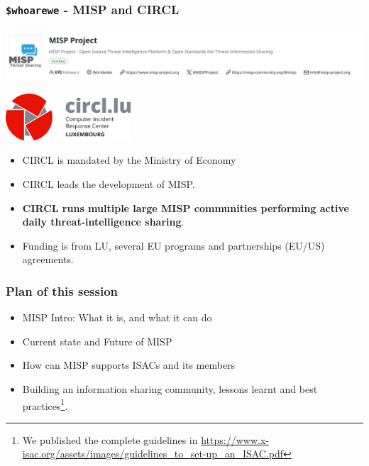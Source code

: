 
\begin{frame}[t,plain]
\titlepage
\end{frame}

\begin{frame}
    \frametitle{\texttt{\$whoarewe} - MISP and CIRCL}
    \begin{center}
            \includegraphics[width=1.0\textwidth]{misp-banner.png}
    \end{center}
    \begin{center}
            \includegraphics[width=0.35\textwidth]{circl.png}
    \end{center}
    \begin{itemize}
            \item CIRCL is mandated by the Ministry of Economy
            \item CIRCL leads the development of MISP.
            \item {\bf CIRCL runs multiple large MISP communities performing active daily threat-intelligence sharing}.
            \item Funding is from LU, several EU programs and partnerships (EU/US) agreements.
    \end{itemize}
\end{frame}

\begin{frame}
    \frametitle{Plan of this session}
    \begin{itemize}
        \item MISP Intro: What it is, and what it can do
        \item Current state and Future of MISP
        \item How can MISP supports ISACs and its members
    \end{itemize}
    \vspace{1em}
    \begin{itemize}
        \item Building an information sharing community, lessons learnt and best practices\footnote{We published the complete guidelines in \url{https://www.x-isac.org/assets/images/guidelines_to_set-up_an_ISAC.pdf}}.
    \end{itemize}
\end{frame}

